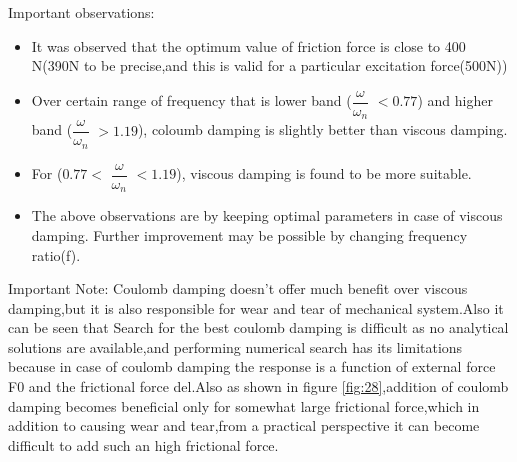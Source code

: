 Important observations:
\begin{itemize}
\item It was observed that the optimum value of friction force is close to 400 N(390N to be precise,and this is valid for a particular excitation force(500N))
\item Over certain range of frequency that is lower band ($\dfrac{\omega}{\omega_n} $ $<0.77 $) and higher band ($\dfrac{\omega}{\omega_n} $ $ >1.19 $), coloumb damping is slightly better than viscous damping. 
\item For ($0.77< $ $\dfrac{\omega}{\omega_n} $ $<1.19 $), viscous damping is found to be more suitable.
\item The above observations are by keeping optimal parameters in case of viscous damping. Further improvement may be possible by changing frequency ratio(f).
\end{itemize}
  
Important Note:
Coulomb damping doesn't offer much benefit over viscous damping,but it is also responsible for wear and tear of mechanical system.Also it can be seen that Search for the best coulomb damping is difficult as no analytical solutions are available,and performing numerical search has its limitations because in case of coulomb damping the response is a function of external force F0 and the frictional force del.Also as shown in figure \ref{fig:28},addition of coulomb damping becomes beneficial only   for somewhat large frictional force,which in addition to causing wear and tear,from a practical perspective it can become difficult to add such an high frictional force.
%